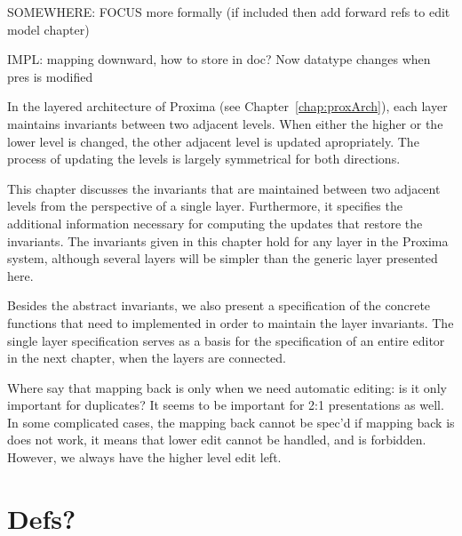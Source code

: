 SOMEWHERE: FOCUS more formally (if included then add forward refs to edit model chapter)


IMPL: mapping downward, how to store in doc? Now datatype changes when pres is modified

\ec



In the layered architecture of Proxima (see Chapter~\ref{chap:proxArch}), each layer maintains invariants between two adjacent levels. When either the higher or the lower level is changed, the other adjacent level is updated apropriately. The process of updating the levels is largely symmetrical for both directions.

This chapter discusses the invariants that are maintained between two adjacent levels from the perspective of a single layer. Furthermore, it specifies the additional information necessary for computing the updates that restore the invariants. The invariants given in this chapter hold for any layer in the Proxima system, although several layers will be simpler than the generic layer presented here.

Besides the abstract invariants, we also present a specification of the concrete functions that need to implemented in order to maintain the layer invariants. The single layer specification serves as a basis for the specification of an entire editor in the next chapter, when the layers are connected.




\bc
Where say that mapping back is only when we need automatic editing: is it only important for duplicates? It seems to be important for 2:1 presentations as well.  In some complicated cases, the mapping back cannot be spec'd if mapping back is does not work, it means that lower edit cannot be handled, and is forbidden. However, we always have the higher level edit left.
\ec


%																
%																
%																
\section{Defs?}

